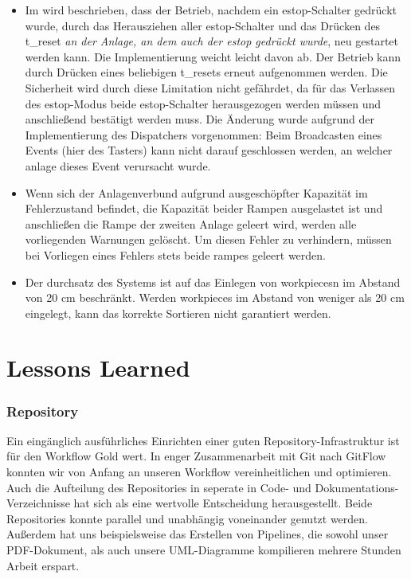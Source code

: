 \begin{itemize}
    \item Im  wird beschrieben, dass der Betrieb, nachdem ein \gls{estop}-Schalter gedrückt wurde,
    durch das Herausziehen aller \gls{estop}-Schalter und das Drücken des \gls{t_reset}
    \textit{an der Anlage, an dem auch der \gls{estop} gedrückt wurde}, neu gestartet werden kann.
    Die Implementierung weicht leicht davon ab.
    Der Betrieb kann durch Drücken eines beliebigen \glspl{t_reset} erneut aufgenommen werden.
    Die Sicherheit wird durch diese Limitation nicht gefährdet, da für das Verlassen des
    \gls{estop}-Modus beide \gls{estop}-Schalter herausgezogen werden müssen und anschließend
    bestätigt werden muss.
    Die Änderung wurde aufgrund der Implementierung des Dispatchers vorgenommen:
    Beim Broadcasten eines Events (hier des Tasters) kann nicht darauf geschlossen werden, an
    welcher \gls{anlage} dieses Event verursacht wurde.
    \item Wenn sich der Anlagenverbund aufgrund ausgeschöpfter Kapazität im Fehlerzustand befindet,
    die Kapazität beider Rampen ausgelastet ist und anschließen die Rampe der zweiten Anlage
    geleert wird, werden alle vorliegenden Warnungen gelöscht.
    Um diesen Fehler zu verhindern, müssen bei Vorliegen eines Fehlers stets beide \glspl{rampe}
    geleert werden.
    \item Der \gls{durchsatz} des Systems ist auf das Einlegen von \glspl{workpiece}n im
    Abstand von 20 cm beschränkt.
    Werden \glspl{workpiece} im Abstand von weniger als 20 cm eingelegt, kann das korrekte Sortieren
    nicht garantiert werden.
\end{itemize}


\section{Lessons Learned}\label{sec:lessons-learned}

\subsubsection{Repository}
Ein eingänglich ausführliches Einrichten einer guten Repository-Infrastruktur ist für den Workflow
Gold wert.
In enger Zusammenarbeit mit Git nach GitFlow konnten wir von Anfang an unseren Workflow vereinheitlichen
und optimieren.
Auch die Aufteilung des Repositories in seperate in Code- und Dokumentations-Verzeichnisse hat sich als
eine wertvolle Entscheidung herausgestellt.
Beide Repositories konnte parallel und unabhängig voneinander genutzt werden.
Außerdem hat uns beispielsweise das Erstellen von Pipelines, die sowohl unser PDF-Dokument, als auch unsere
UML-Diagramme kompilieren mehrere Stunden Arbeit erspart.


